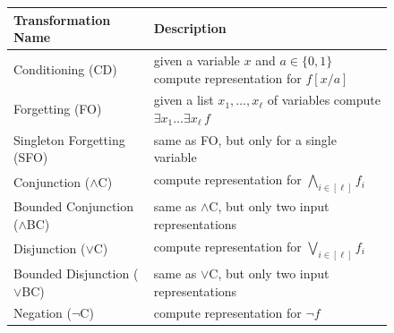 \documentclass[a4paper,UKenglish,cleveref, autoref, thm-restate]{lipics-v2021}
\begin{document}
\begin{figure}[t]

  \begin{tabular}{l|l}

\textbf{Transformation Name}	& \textbf{Description} \\
	\hline
	Conditioning (CD) & given a variable $x$ and $a\in \{0,1\}$ compute representation for $f[x/a]$ \\
	Forgetting (FO) &  given a list $x_1, \ldots, x_\ell$ of variables compute $\exists x_1 \ldots \exists x_\ell \, f$\\
	Singleton Forgetting (SFO) &  same as FO, but only for a single variable\\
	Conjunction ($\land$C) &  compute representation for $\bigwedge_{i\in [\ell]} f_i$\\
	Bounded Conjunction ($\land$BC) &  same as $\land$C, but only two input representations\\
	Disjunction ($\lor$C) &  compute representation for $\bigvee_{i\in [\ell]} f_i$\\
	Bounded Disjunction ($\lor$BC)& same as $\lor$C, but only two input representations \\
	Negation ($\neg$C)& compute representation for $\neg f$ \\
\end{tabular}


\end{figure}
\end{document}
